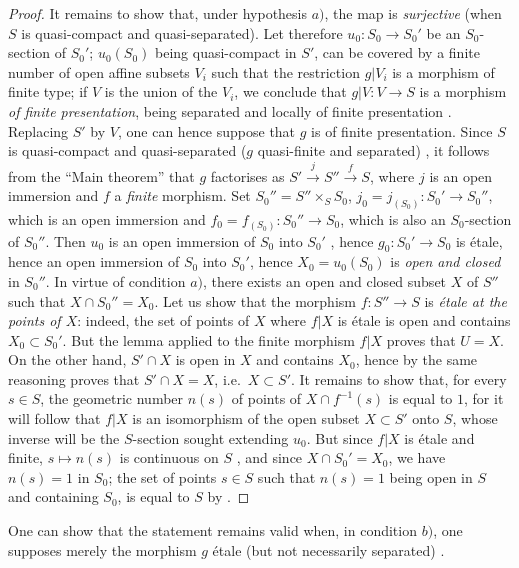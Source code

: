\begin{proof}
It remains to show that, under hypothesis $a)$, the map  is \emph{surjective} (when $S$ is quasi-compact and quasi-separated).
Let therefore $u_0:S_0\to S_0'$ be an $S_0$-section of $S_0'$;
$u_0(S_0)$ being quasi-compact in $S'$, can be covered by a finite number of open affine subsets $V_i$ such that the restriction $g|V_i$ is a morphism of finite type;
if $V$ is the union of the $V_i$, we conclude that $g|V:V\to S$ is a morphism \emph{of finite presentation}, being separated and locally of finite presentation .
Replacing $S'$ by $V$, one can hence suppose that $g$ is of finite presentation.
Since $S$ is quasi-compact and quasi-separated ($g$ quasi-finite and separated) , it follows from the ``Main theorem''  that $g$ factorises as $S'\xrightarrow{j}S''\xrightarrow{f}S$, where $j$ is an open immersion and $f$ a \emph{finite} morphism.
Set $S_0''=S''\times_S S_0$, $j_0=j_{(S_0)}:S_0'\to S_0''$, which is an open immersion and $f_0=f_{(S_0)}:S_0''\to S_0$, which is also an $S_0$-section of $S_0''$.
Then $u_0$ is an open immersion of $S_0$ into $S_0'$ , hence $g_0:S_0'\to S_0$ is \'etale, hence an open immersion of $S_0$ into $S_0'$, hence $X_0=u_0(S_0)$ is \emph{open and closed} in $S_0''$.
In virtue of condition $a)$, there exists an open and closed subset $X$ of $S''$ such that $X\cap S_0''=X_0$.
Let us show that the morphism $f:S''\to S$ is \emph{\'etale at the points of $X$}:
indeed, the set of points of $X$ where $f|X$ is \'etale is open and contains $X_0\subset S_0'$.
But the lemma  applied to the finite morphism $f|X$ proves that $U=X$.
On the other hand, $S'\cap X$ is open in $X$ and contains $X_0$, hence by the same reasoning proves that $S'\cap X=X$, i.e.\ $X\subset S'$.
It remains to show that, for every $s\in S$, the geometric number $n(s)$ of points of $X\cap f^{-1}(s)$ is equal to $1$, for it will follow that $f|X$ is an isomorphism of the open subset $X\subset S'$ onto $S$, whose inverse will be the $S$-section sought extending $u_0$.
But since $f|X$ is \'etale and finite, $s\mapsto n(s)$ is continuous on $S$ , and since $X\cap S_0'=X_0$, we have $n(s)=1$ in $S_0$;
the set of points $s\in S$ such that $n(s)=1$ being open in $S$ and containing $S_0$, is equal to $S$ by .
\end{proof}

\begin{remark}[18.5.4.4]
\label{IV.18.5.4.4}
One can show that the statement  remains valid when, in condition $b)$, one supposes merely the morphism $g$ \'etale (but not necessarily separated) \cite[exp.~XII]{SGA1}.
\end{remark}

